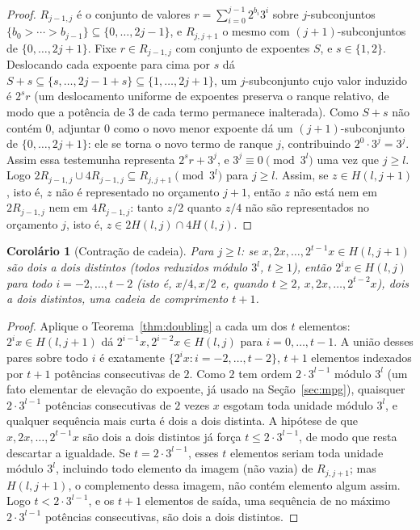\documentclass[11pt]{amsart}
\theoremstyle{plain}
\newtheorem{corollary}[theorem]{Corol\'ario}
\theoremstyle{definition}
\theoremstyle{remark}
\begin{document}
\begin{proof}
$R_{j-1,j}$ é o conjunto de valores $r=\sum_{i=0}^{j-1}2^{b_i}3^i$ sobre $j$-subconjuntos
$\{b_0>\cdots>b_{j-1}\}\subseteq\{0,\dots,2j-1\}$, e $R_{j,j+1}$ o mesmo com $(j{+}1)$-subconjuntos
de $\{0,\dots,2j+1\}$. Fixe $r\in R_{j-1,j}$ com conjunto de expoentes $S$, e $s\in\{1,2\}$.
Deslocando cada expoente para cima por $s$ dá $S+s\subseteq\{s,\dots,2j-1+s\}\subseteq\{1,\dots,2j+1\}$,
um $j$-subconjunto cujo valor induzido é $2^sr$ (um deslocamento uniforme de expoentes preserva o
ranque relativo, de modo que a potência de $3$ de cada termo permanece inalterada). Como $S+s$ não
contém $0$, adjuntar $0$ como o novo menor expoente dá um $(j{+}1)$-subconjunto de
$\{0,\dots,2j+1\}$: ele se torna o novo termo de ranque $j$, contribuindo $2^0\cdot3^j=3^j$. Assim
essa testemunha representa $2^sr+3^j$, e $3^j\equiv0\pmod{3^l}$ uma vez que $j\ge l$. Logo
$2R_{j-1,j}\cup4R_{j-1,j}\subseteq R_{j,j+1}\pmod{3^l}$ para $j\ge l$. Assim, se $z\in H(l,j+1)$,
isto é, $z$ não é representado no orçamento $j+1$, então $z$ não está nem em $2R_{j-1,j}$ nem em
$4R_{j-1,j}$: tanto $z/2$ quanto $z/4$ não são representados no orçamento $j$, isto é,
$z\in2H(l,j)\cap4H(l,j)$.
\end{proof}

\begin{corollary}[Contração de cadeia]
\label{cor:chain}
Para $j\ge l$: se $x, 2x, \dots, 2^{t-1}x \in H(l,j+1)$ são dois a dois distintos (todos reduzidos
módulo $3^l$, $t\ge1$), então $2^ix \in H(l,j)$ para todo $i=-2,\dots,t-2$ (isto é, $x/4,x/2$ e,
quando $t\ge2$, $x,2x,\dots,2^{t-2}x$), dois a dois distintos, uma cadeia de comprimento $t+1$.
\end{corollary}

\begin{proof}
Aplique o Teorema~\ref{thm:doubling} a cada um dos $t$ elementos: $2^ix\in H(l,j+1)$ dá
$2^{i-1}x, 2^{i-2}x\in H(l,j)$ para $i=0,\dots,t-1$. A união desses pares sobre todo $i$ é
exatamente $\{2^ix : i=-2,\dots,t-2\}$, $t+1$ elementos indexados por $t+1$ potências consecutivas
de $2$. Como $2$ tem ordem $2\cdot3^{l-1}$ módulo $3^l$ (um fato elementar de elevação do
expoente, já usado na Seção~\ref{sec:mpg}), quaisquer $2\cdot3^{l-1}$ potências consecutivas de $2$
vezes $x$ esgotam toda unidade módulo $3^l$, e qualquer sequência mais curta é dois a dois
distinta. A hipótese de que $x,2x,\dots,2^{t-1}x$ são dois a dois distintos já força
$t\le2\cdot3^{l-1}$, de modo que resta descartar a igualdade. Se $t=2\cdot3^{l-1}$, esses $t$
elementos seriam toda unidade módulo $3^l$, incluindo todo elemento da imagem (não vazia) de
$R_{j,j+1}$; mas $H(l,j+1)$, o complemento dessa imagem, não contém elemento algum assim. Logo
$t<2\cdot3^{l-1}$, e os $t+1$ elementos de saída, uma sequência de no máximo $2\cdot3^{l-1}$
potências consecutivas, são dois a dois distintos.
\end{proof}
\end{document}
